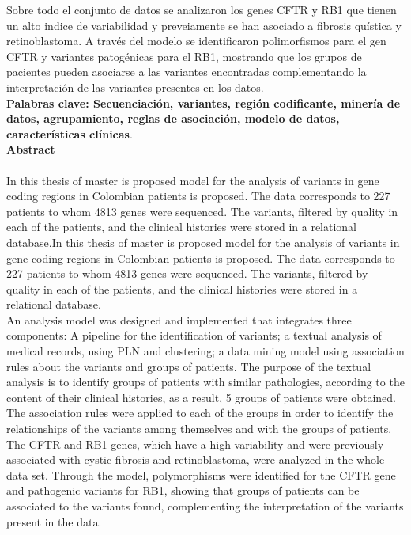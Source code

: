 Sobre todo el conjunto de datos se analizaron los genes CFTR y RB1 que tienen un alto indice de variabilidad y preveiamente se han asociado a fibrosis quística y retinoblastoma. A través del modelo se identificaron polimorfismos para el gen CFTR y variantes patogénicas para el RB1, mostrando que los grupos de pacientes pueden asociarse  a las variantes encontradas complementando la interpretación de las variantes presentes en los datos.   \\

\textbf{\small Palabras clave: Secuenciación, variantes, región codificante, minería de datos, agrupamiento, reglas de asociación, modelo de datos, características clínicas}.\\


\textbf{\LARGE Abstract}\\\\
In this thesis of master is proposed  model for the analysis of variants in gene coding regions in Colombian patients is proposed. The data corresponds to 227 patients to whom 4813 genes were sequenced. The variants, filtered by quality in each of the patients, and the clinical histories were stored in a relational database.In this thesis of master is proposed  model for the analysis of variants in gene coding regions in Colombian patients is proposed. The data corresponds to 227 patients to whom 4813 genes were sequenced. The variants, filtered by quality in each of the patients, and the clinical histories were stored in a relational database. \\

An analysis model was designed and implemented that integrates three components: A pipeline for the identification of variants; a textual analysis of medical records, using PLN and clustering; a data mining model using association rules about the variants and groups of patients. The purpose of the textual analysis is to identify groups of patients with similar pathologies, according to the content of their clinical histories, as a result, 5 groups of patients were obtained. The association rules were applied to each of the groups in order to identify the relationships of the variants among themselves and with the groups of patients. \\

The CFTR and RB1 genes, which have a high variability and were previously associated with cystic fibrosis and retinoblastoma, were analyzed in the whole data set. Through the model, polymorphisms were identified for the CFTR gene and pathogenic variants for RB1, showing that groups of patients can be associated to the variants found, complementing the interpretation of the variants present in the data. \\

